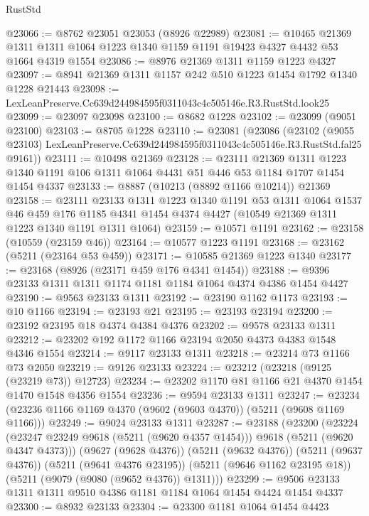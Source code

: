\begin{lexlean}{RustStd}
\begin{coremodule}
@23066 := @8762 @23051 @23053 (@8926 @22989)
@23081 := @10465
    @21369
    @1311
    @1311
    @1064
    @1223
    @1340
    @1159
    @1191
    @19423
    @4327
    @4432
    @53
    @1664
    @4319
    @1554
@23086 := @8976 @21369 @1311 @1159 @1223 @4327
@23097 := @8941 @21369 @1311 @1157 @242 @510 @1223 @1454 @1792 @1340 @1228 @21443
@23098 := LexLeanPreserve.Cc639d244984595f0311043c4c505146e.R3.RustStd.look25
@23099 := @23097 @23098
@23100 := @8682 @1228
@23102 := @23099 (@9051 @23100)
@23103 := @8705 @1228
@23110 := @23081
    (@23086
      (@23102
        (@9055 @23103)
        LexLeanPreserve.Cc639d244984595f0311043c4c505146e.R3.RustStd.fal25
        @9161))
@23111 := @10498 @21369
@23128 := @23111
    @21369
    @1311
    @1223
    @1340
    @1191
    @106
    @1311
    @1064
    @4431
    @51
    @446
    @53
    @1184
    @1707
    @1454
    @1454
    @4337
@23133 := @8887 (@10213 (@8892 @1166 @10214)) @21369
@23158 := @23111
    @23133
    @1311
    @1223
    @1340
    @1191
    @53
    @1311
    @1064
    @1537
    @46
    @459
    @176
    @1185
    @4341
    @1454
    @4374
    @4427
    (@10549 @21369 @1311 @1223 @1340 @1191 @1311 @1064)
@23159 := @10571 @1191
@23162 := @23158 (@10559 (@23159 @46))
@23164 := @10577 @1223 @1191
@23168 := @23162 (@5211 (@23164 @53 @459))
@23171 := @10585 @21369 @1223 @1340
@23177 := @23168 (@8926 (@23171 @459 @176 @4341 @1454))
@23188 := @9396 @23133 @1311 @1311 @1174 @1181 @1184 @1064 @4374 @4386 @1454 @4427
@23190 := @9563 @23133 @1311
@23192 := @23190 @1162 @1173
@23193 := @10 @1166
@23194 := @23193 @21
@23195 := @23193 @23194
@23200 := @23192 @23195 @18 @4374 @4384 @4376
@23202 := @9578 @23133 @1311
@23212 := @23202 @192 @1172 @1166 @23194 @2050 @4373 @4383 @1548 @4346 @1554
@23214 := @9117 @23133 @1311
@23218 := @23214 @73 @1166 @73 @2050
@23219 := @9126 @23133
@23224 := @23212 (@23218 (@9125 (@23219 @73)) @12723)
@23234 := @23202 @1170 @81 @1166 @21 @4370 @1454 @1470 @1548 @4356 @1554
@23236 := @9594 @23133 @1311
@23247 := @23234 (@23236 @1166 @1169 @4370 (@9602 (@9603 @4370)) (@5211 (@9608 @1169 @1166)))
@23249 := @9024 @23133 @1311
@23287 := @23188
    (@23200
      (@23224 (@23247 @23249 @9618 (@5211 (@9620 @4357 @1454))) @9618 (@5211 (@9620 @4347 @4373)))
      (@9627 (@9628 @4376))
      (@5211 (@9632 @4376))
      (@5211 (@9637 @4376))
      (@5211 (@9641 @4376 @23195))
      (@5211 (@9646 @1162 @23195 @18))
      (@5211 (@9079 (@9080 (@9652 @4376)) @1311)))
@23299 := @9506 @23133 @1311 @1311 @9510 @4386 @1181 @1184 @1064 @1454 @4424 @1454 @4337
@23300 := @8932 @23133
@23304 := @23300 @1181 @1064 @1454 @4423

\end{coremodule}
\end{lexlean}

